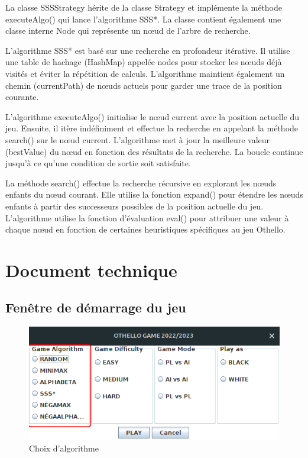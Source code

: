 \documentclass[12pt]{article}
\begin{document}
	La classe SSSStrategy hérite de la classe Strategy et implémente la méthode executeAlgo() qui lance l'algorithme SSS*. La classe contient également une classe interne Node qui représente un nœud de l'arbre de recherche.
	
	L'algorithme SSS* est basé sur une recherche en profondeur itérative. Il utilise une table de hachage (HashMap) appelée nodes pour stocker les nœuds déjà visités et éviter la répétition de calculs. L'algorithme maintient également un chemin (currentPath) de nœuds actuels pour garder une trace de la position courante.
	
	L'algorithme executeAlgo() initialise le nœud current avec la position actuelle du jeu. Ensuite, il itère indéfiniment et effectue la recherche en appelant la méthode search() sur le nœud current. L'algorithme met à jour la meilleure valeur (bestValue) du nœud en fonction des résultats de la recherche. La boucle continue jusqu'à ce qu'une condition de sortie soit satisfaite.
	
	La méthode search() effectue la recherche récursive en explorant les nœuds enfants du nœud courant. Elle utilise la fonction expand() pour étendre les nœuds enfants à partir des successeurs possibles de la position actuelle du jeu. L'algorithme utilise la fonction d'évaluation eval() pour attribuer une valeur à chaque nœud en fonction de certaines heuristiques spécifiques au jeu Othello.

	


\section{Document technique}

\subsection{Fenêtre de démarrage du jeu}
	
		\begin{figure}[H]
		\centering
		\includegraphics[scale=0.7]{img/algo.png}
		\caption{Choix d'algorithme }
		\label{Algo}
	\end{figure}
\end{document}
